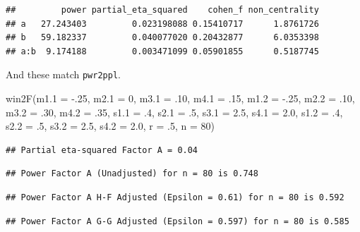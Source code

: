 \documentclass[
]{book}
\newenvironment{Shaded}{\begin{snugshade}}{\end{snugshade}}
\newcommand{\AttributeTok}[1]{\textcolor[rgb]{0.77,0.63,0.00}{#1}}
\newcommand{\DecValTok}[1]{\textcolor[rgb]{0.00,0.00,0.81}{#1}}
\newcommand{\FloatTok}[1]{\textcolor[rgb]{0.00,0.00,0.81}{#1}}
\newcommand{\FunctionTok}[1]{\textcolor[rgb]{0.00,0.00,0.00}{#1}}
\newcommand{\NormalTok}[1]{#1}
\newcommand{\SpecialCharTok}[1]{\textcolor[rgb]{0.00,0.00,0.00}{#1}}
\begin{document}
\begin{verbatim}
##         power partial_eta_squared    cohen_f non_centrality
## a   27.243403         0.023198088 0.15410717      1.8761726
## b   59.182337         0.040077020 0.20432877      6.0353398
## a:b  9.174188         0.003471099 0.05901855      0.5187745
\end{verbatim}

And these match \texttt{pwr2ppl}.

\begin{Shaded}
\begin{Highlighting}[]
\FunctionTok{win2F}\NormalTok{(}\AttributeTok{m1.1 =} \SpecialCharTok{{-}}\NormalTok{.}\DecValTok{25}\NormalTok{, }\AttributeTok{m2.1 =} \DecValTok{0}\NormalTok{,}
      \AttributeTok{m3.1 =}\NormalTok{ .}\DecValTok{10}\NormalTok{, }\AttributeTok{m4.1 =}\NormalTok{ .}\DecValTok{15}\NormalTok{,}
      \AttributeTok{m1.2 =} \SpecialCharTok{{-}}\NormalTok{.}\DecValTok{25}\NormalTok{, }\AttributeTok{m2.2 =}\NormalTok{ .}\DecValTok{10}\NormalTok{,}
      \AttributeTok{m3.2 =}\NormalTok{ .}\DecValTok{30}\NormalTok{, }\AttributeTok{m4.2 =}\NormalTok{ .}\DecValTok{35}\NormalTok{,}
      \AttributeTok{s1.1 =}\NormalTok{ .}\DecValTok{4}\NormalTok{, }\AttributeTok{s2.1 =}\NormalTok{ .}\DecValTok{5}\NormalTok{,}
      \AttributeTok{s3.1 =} \FloatTok{2.5}\NormalTok{, }\AttributeTok{s4.1 =} \FloatTok{2.0}\NormalTok{,}
      \AttributeTok{s1.2 =}\NormalTok{ .}\DecValTok{4}\NormalTok{, }\AttributeTok{s2.2 =}\NormalTok{ .}\DecValTok{5}\NormalTok{,}
      \AttributeTok{s3.2 =} \FloatTok{2.5}\NormalTok{, }\AttributeTok{s4.2 =} \FloatTok{2.0}\NormalTok{,}
      \AttributeTok{r =}\NormalTok{ .}\DecValTok{5}\NormalTok{, }\AttributeTok{n =} \DecValTok{80}\NormalTok{)}
\end{Highlighting}
\end{Shaded}

\begin{verbatim}
## Partial eta-squared Factor A = 0.04
\end{verbatim}

\begin{verbatim}
## Power Factor A (Unadjusted) for n = 80 is 0.748
\end{verbatim}

\begin{verbatim}
## Power Factor A H-F Adjusted (Epsilon = 0.61) for n = 80 is 0.592
\end{verbatim}

\begin{verbatim}
## Power Factor A G-G Adjusted (Epsilon = 0.597) for n = 80 is 0.585
\end{verbatim}
\end{document}
